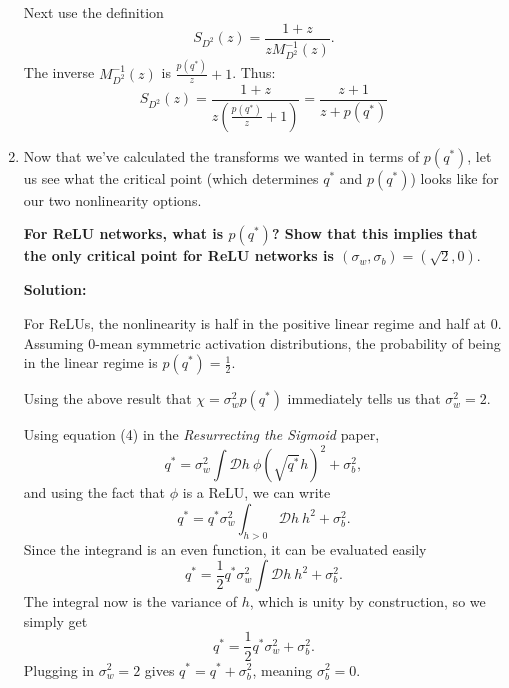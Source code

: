 \documentclass[a4paper]{article}
\begin{document}
\begin{enumerate}[label=(\alph*)]
\begin{tcolorbox}
Next use the definition 
\begin{equation*}
    S_{D ^2} (z) = \frac{1+z}{z M_{D^2}^{-1} (z)}.
\end{equation*}
The inverse $M_{D^2}^{-1}(z)$ is $\frac{p(q^*)}{z} + 1$. Thus:
$$ S_{D^2}(z) = \frac{1+z}{z \left(\frac{p(q^*)}{z} + 1\right)}  = \frac{z+1}{z+ p(q^*)}$$
\end{tcolorbox}

\item Now that we've calculated the transforms we wanted in terms of $p(q^*)$, let us see what the critical point (which determines $q^*$ and $p(q^*)$) looks like for our two nonlinearity options.  

\textbf{For ReLU networks, what is $p(q^*)$?  Show that this implies that the only critical point for ReLU networks is $(\sigma_w, \sigma_b) = (\sqrt{2},0).$} 

\begin{tcolorbox}
\textbf{Solution:}

For ReLUs, the nonlinearity is half in the positive linear regime and half at $0$. Assuming $0$-mean symmetric activation distributions, the probability of being in the linear regime is $p(q^*) = \frac{1}{2}$. 

Using the above result that $\chi = \sigma_w^2 p(q^*)$ immediately tells us that $\sigma_w^2 = 2$.  

Using equation (4) in the \emph{Resurrecting the Sigmoid} paper, 
\begin{equation}
    q^* = \sigma_w^2 \int \mathcal{D} h ~\phi(\sqrt{q^*}h)^2 + \sigma_b^2,
\end{equation}
and using the fact that $\phi$ is a ReLU, we can write 
\begin{equation}
    q^* = q^* \sigma_w^2 \int_{h>0} \mathcal{D} h~ h^2 + \sigma_b^2.
\end{equation}
Since the integrand is an even function, it can be evaluated easily
\begin{equation}
    q^* = \frac{1}{2} q^* \sigma_w^2 \int \mathcal{D} h~ h^2 + \sigma_b^2.
\end{equation}
The integral now is the variance of $h$, which is unity by construction, so we simply get
\begin{equation}
    q^* = \frac{1}{2} q^* \sigma_w^2  + \sigma_b^2.
\end{equation}
Plugging in $\sigma_w^2=2$ gives $q^* = q^* + \sigma_b^2$, meaning $\sigma_b^2 = 0$.
\end{tcolorbox}


\end{enumerate}
\end{document}
